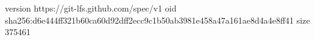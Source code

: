 version https://git-lfs.github.com/spec/v1
oid sha256:d6e444ff321b60ca60d92dff2ecc9c1b50ab3981e458a47a161ae8d4a4e8ff41
size 375461
